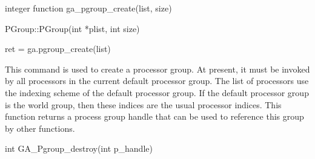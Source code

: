 \documentclass[12pt]{article}
\begin{document}
\begin{fapi}
\begin{fcode}
integer function ga_pgroup_create(list, size)
\end{fcode}
\begin{funcargs}
\end{funcargs}
\end{fapi}

\begin{cxxapi}
\begin{cxxcode}
PGroup::PGroup(int *plist, int size)
\end{cxxcode}
\begin{funcargs}
\end{funcargs}
\end{cxxapi}

\begin{pyapi}
\begin{pycode}
ret = ga.pgroup_create(list)
\end{pycode}
\begin{funcargs}
\end{funcargs}
\end{pyapi}

\dcoll

\begin{desc}

This command is used to create a processor group. At present, it must be
invoked by all processors in the current default processor group. The list of
processors use the indexing scheme of the default processor group. If the
default processor group is the world group, then these indices are the usual
processor indices. This function returns a process group handle that can be
used to reference this group by other functions.

\end{desc}



\begin{capi}
\begin{ccode}
int GA_Pgroup_destroy(int p_handle)
\end{ccode}
\begin{funcargs}
\end{funcargs}
\end{capi}
\end{document}
